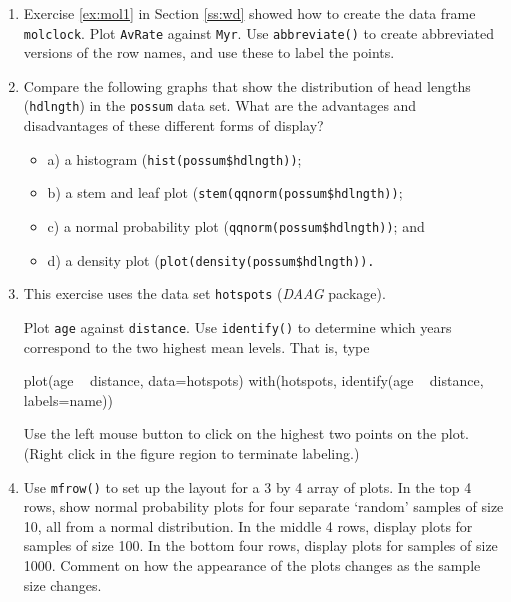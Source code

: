\documentclass{tufte-book}\usepackage[]{graphicx}\usepackage[]{color}
\newcommand{\txtt}[1]{\texttt{#1}}
\newenvironment{itemizz}%
  {\begin{itemize} %
    \setlength{\itemsep}{2pt}%
    \setlength{\parskip}{2pt}} %
  {\end{itemize}}
\begin{document}
\begin{enumerate}
\item Exercise \ref{ex:mol1} in Section \ref{ss:wd} showed how to
create the data frame \txtt{molclock}.  Plot \txtt{AvRate}
  against \txtt{Myr}. Use \txtt{abbreviate()} to create abbreviated
  versions of the row names, and use these to label the
  points.\label{ex:molclock}

\item Compare the following graphs that show the distribution of head
  lengths (\txtt{hdlngth}) in the \txtt{possum} data set.
What are the advantages and disadvantages of these different
forms of display?
\begin{itemizz}
\item[] a) a histogram (\txtt{hist(possum\$hdlngth))};

\item[] b) a stem and leaf plot (\txtt{stem(qqnorm(possum\$hdlngth))};

\item[] c) a normal probability plot (\txtt{qqnorm(possum\$hdlngth))};
and

\item[] d) a density plot (\txtt{plot(density(possum\$hdlngth)).}
\end{itemizz}

\item This exercise uses the data set \txtt{hotspots}
  (\textit{DAAG} package).

Plot \txtt{age} against \txtt{distance}.  Use \txtt{identify()} to
determine which years correspond to the two highest mean levels. That
is, type
\begin{Schunk}
\begin{Sinput}
plot(age ~ distance, data=hotspots)
with(hotspots, identify(age ~ distance, labels=name))
\end{Sinput}
\end{Schunk}
Use the left mouse button to click on the highest two points
on the plot. (Right click in the figure region to terminate labeling.)

\item Use \txtt{mfrow()} to set up the layout for a 3 by 4 array
of plots. In the top 4 rows, show normal probability plots
for four separate `random' samples of size 10, all from
a normal distribution. In the middle 4 rows, display plots for
samples of size 100. In the bottom four rows, display plots for
samples of size 1000. Comment on how the appearance of the plots
changes as the sample size changes.


\end{enumerate}
\end{document}
